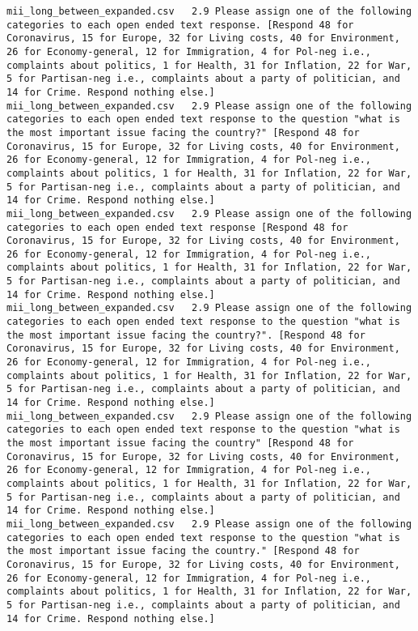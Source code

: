 \begin{lstlisting}[label=lst:promptvariants]
mii_long_between_expanded.csv	2.9	Please assign one of the following categories to each open ended text response. [Respond 48 for Coronavirus, 15 for Europe, 32 for Living costs, 40 for Environment, 26 for Economy-general, 12 for Immigration, 4 for Pol-neg i.e., complaints about politics, 1 for Health, 31 for Inflation, 22 for War, 5 for Partisan-neg i.e., complaints about a party of politician, and 14 for Crime. Respond nothing else.]
mii_long_between_expanded.csv	2.9	Please assign one of the following categories to each open ended text response to the question "what is the most important issue facing the country?" [Respond 48 for Coronavirus, 15 for Europe, 32 for Living costs, 40 for Environment, 26 for Economy-general, 12 for Immigration, 4 for Pol-neg i.e., complaints about politics, 1 for Health, 31 for Inflation, 22 for War, 5 for Partisan-neg i.e., complaints about a party of politician, and 14 for Crime. Respond nothing else.]
mii_long_between_expanded.csv	2.9	Please assign one of the following categories to each open ended text response [Respond 48 for Coronavirus, 15 for Europe, 32 for Living costs, 40 for Environment, 26 for Economy-general, 12 for Immigration, 4 for Pol-neg i.e., complaints about politics, 1 for Health, 31 for Inflation, 22 for War, 5 for Partisan-neg i.e., complaints about a party of politician, and 14 for Crime. Respond nothing else.]
mii_long_between_expanded.csv	2.9	Please assign one of the following categories to each open ended text response to the question "what is the most important issue facing the country?". [Respond 48 for Coronavirus, 15 for Europe, 32 for Living costs, 40 for Environment, 26 for Economy-general, 12 for Immigration, 4 for Pol-neg i.e., complaints about politics, 1 for Health, 31 for Inflation, 22 for War, 5 for Partisan-neg i.e., complaints about a party of politician, and 14 for Crime. Respond nothing else.]
mii_long_between_expanded.csv	2.9	Please assign one of the following categories to each open ended text response to the question "what is the most important issue facing the country" [Respond 48 for Coronavirus, 15 for Europe, 32 for Living costs, 40 for Environment, 26 for Economy-general, 12 for Immigration, 4 for Pol-neg i.e., complaints about politics, 1 for Health, 31 for Inflation, 22 for War, 5 for Partisan-neg i.e., complaints about a party of politician, and 14 for Crime. Respond nothing else.]
mii_long_between_expanded.csv	2.9	Please assign one of the following categories to each open ended text response to the question "what is the most important issue facing the country." [Respond 48 for Coronavirus, 15 for Europe, 32 for Living costs, 40 for Environment, 26 for Economy-general, 12 for Immigration, 4 for Pol-neg i.e., complaints about politics, 1 for Health, 31 for Inflation, 22 for War, 5 for Partisan-neg i.e., complaints about a party of politician, and 14 for Crime. Respond nothing else.]

\end{lstlisting}
